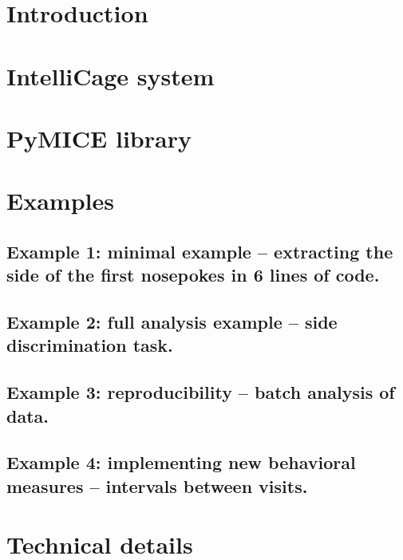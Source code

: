 \section{Introduction}
\label{intro}


\section{IntelliCage system}
\label{sec:1}


\section{PyMICE library}
\label{sec:2}


\section{Examples}
\label{sec:3}


\subsection{Example 1: minimal example -- extracting the side of the first nosepokes in 6 lines of code.}
\label{sec:3:1}


\subsection{Example 2: full analysis example -- side discrimination task.}
\label{sec:3:2}


\subsection{Example 3: reproducibility -- batch analysis of data.}
\label{sec:3:3}


\subsection*{Example 4: implementing new behavioral measures -- intervals between visits.}
\label{sec:3:4}
 


\section{Technical details}
\label{sec:4}


